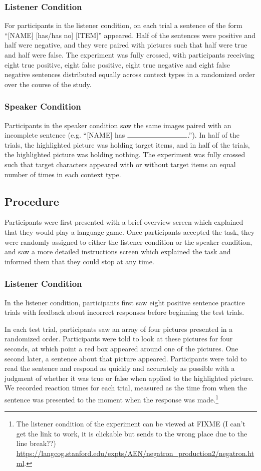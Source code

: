 \documentclass[man]{apa2}
\begin{document}
\subsubsection{Listener Condition}
For participants in the listener condition, on each trial a sentence of the form ``[NAME] [has/has no] [ITEM]'' appeared.  Half of the sentences were positive and half were negative, and they were paired with pictures such that half were true and half were false.  The experiment was fully crossed, with participants receiving eight true positive, eight false positive, eight true negative and eight false negative sentences distributed equally across context types in a randomized order over the course of the study.  

\subsubsection{Speaker Condition}
Participants in the speaker condition saw the same images paired with an incomplete sentence (e.g. ``[NAME] has $\rule{3cm}{0.15mm}$.''). In half of the trials, the highlighted picture was holding target items, and in half of the trials, the highlighted picture was holding nothing.  The experiment was fully crossed such that target characters appeared with or without target items an equal number of times in each context type.  

\subsection{Procedure}
Participants were first presented with a brief overview screen which explained that they would play a language game.  Once participants accepted the task, they were randomly assigned to either the listener condition or the speaker condition, and saw a more detailed instructions screen which explained the task and informed them that they could stop at any time.  

\subsubsection{Listener Condition}

In the listener condition, participants first saw eight positive sentence practice trials with feedback about incorrect responses before beginning the test trials. 

In each test trial, participants saw an array of four pictures presented in a randomized order.  Participants were told to look at these pictures for four seconds, at which point a red box appeared around one of the pictures.  One second later, a sentence about that picture appeared.  Participants were told to read the sentence and respond as quickly and accurately as possible with a judgment of whether it was true or false when applied to the highlighted picture.  We recorded reaction times for each trial, measured as the time from when the sentence was presented to the moment when the response was made.\footnote{The listener condition of the experiment can be viewed at 
FIXME (I can't get the link to work, it is clickable but sends to the wrong place due to the line break??) \url{https://langcog.stanford.edu/expts/AEN/negatron_production2/negatron.html}.}
\end{document}
